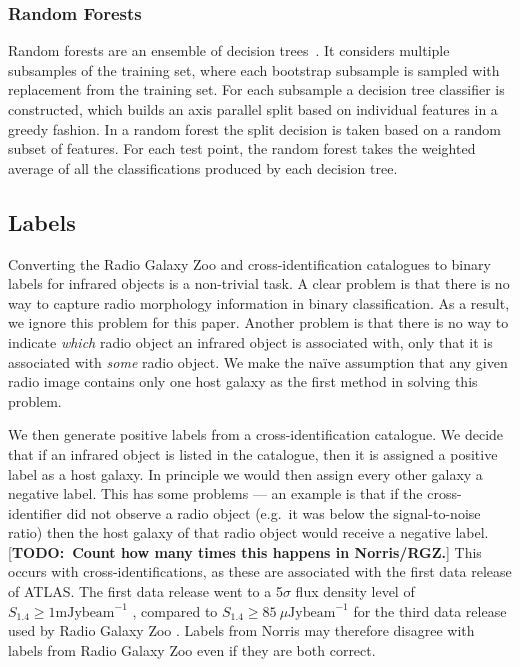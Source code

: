 \documentclass[fleqn,usenatbib,usedcolumn]{mnras}
\newcommand{\text}{\mathrm}
\newcommand{\todo}[1]{ {\color{red}[{\bf TODO:~{#1}}]} }
\begin{document}
    \subsubsection{Random Forests}
    \label{sec:random-forests}

      Random forests are an ensemble of decision
      trees~\citep{breiman01random-forest}. It considers multiple subsamples
      of the training set, where each bootstrap subsample is sampled with
      replacement from the training set. For each subsample a decision tree
      classifier is constructed, which builds an axis parallel split based on
      individual features in a greedy fashion. In a random forest the split
      decision is taken based on a random subset of features. For each test
      point, the random forest takes the weighted average of all the
      classifications produced by each decision tree.

  \subsection{Labels}\label{labels}

    Converting the Radio Galaxy Zoo and \citet{norris06} cross-identification
    catalogues to binary labels for infrared objects is a non-trivial task. A
    clear problem is that there is no way to capture radio morphology
    information in binary classification. As a result, we ignore this problem
    for this paper. Another problem is that there is no way to indicate
    \emph{which} radio object an infrared object is associated with, only that
    it is associated with \emph{some} radio object. We make the na\"ive
    assumption that any given radio image contains only one host galaxy as the
    first method in solving this problem.

    We then generate positive labels from a cross-identification catalogue.
    We decide that if an infrared object is listed in the catalogue, then it
    is assigned a positive label as a host galaxy. In principle we would
    then assign every other galaxy a negative label. This has some problems
    --- an example is that if the cross-identifier did not observe a radio
    object (e.g.~it was below the signal-to-noise ratio) then the host galaxy
    of that radio object would receive a negative label.
    \todo{Count how many times this happens in Norris/RGZ.} This occurs
    with \citet{norris06} cross-identifications, as these are associated with
    the first data release of ATLAS. The first data release went to a
    5$\sigma$ flux density level of $S_{1.4} \geq 1 \text{ mJy beam}^{-1}$
    \citep{norris06}, compared to $S_{1.4} \geq 85\ \mu\text{Jy beam}^{-1}$
    for the third data release used by Radio Galaxy Zoo \citep{franzen15}.
    Labels from Norris may therefore disagree with labels from Radio Galaxy
    Zoo even if they are both correct.
\end{document}
